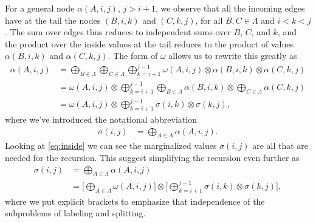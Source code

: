   For a general node $\alpha(A, i, j)$, $j > i + 1$, we observe that all the incoming edges have at the tail the nodes $(B, i, k)$ and $(C, k, j)$, for all $B, C \in \Lambda$ and $i < k < j$. The sum over edges thus reduces to independent sums over $B$, $C$, and $k$, and the product over the inside values at the tail reduces to the product of values $\alpha(B, i, k)$ and $\alpha(C, k, j)$. The form of $\omega$ allows us to rewrite this greatly as
  \begin{align}
    \label{eq:inside}
    \alpha(A, i, j)
      &= \bigoplus_{B \in \Lambda} \bigoplus_{C \in \Lambda} \bigoplus_{k=i+1}^{j-1} \omega(A, i, j) \otimes \alpha(B,i,k) \otimes \alpha(C,k,j) \nonumber \\
      &= \omega(A, i, j) \otimes \bigoplus_{k=i+1}^{j-1} \bigoplus_{B \in \Lambda} \alpha(B,i,k) \otimes \bigoplus_{C \in \Lambda} \alpha(C,k,j) \nonumber \\
      &= \omega(A, i, j) \otimes \bigoplus_{k=i+1}^{j-1} \sigma(i,k) \otimes \sigma(k,j),
  \end{align}
  where we've introduced the notational abbreviation
  \begin{align*}
      \sigma(i,j) &= \bigoplus_{A \in \Lambda} \alpha(A,i,j).
  \end{align*}
  Looking at \ref{eq:inside} we can see the marginalized values $\sigma(i, j)$ are all that are needed for the recursion. This suggest simplifying the recursion even further as
  \begin{align}
    \label{eq:inside-simplified}
    \sigma(i, j)
      &= \bigoplus_{A \in \Lambda} \alpha(A,i,j) \nonumber \\
      &= \Bigg[ \bigoplus_{A \in \Lambda} \omega(A, i, j) \Bigg] \otimes \Bigg[\bigoplus_{k=i+1}^{j-1} \sigma(i,k) \otimes  \sigma(k,j) \Bigg],
  \end{align}
  where we put explicit brackets to emphasize that independence of the subproblems of labeling and splitting.

